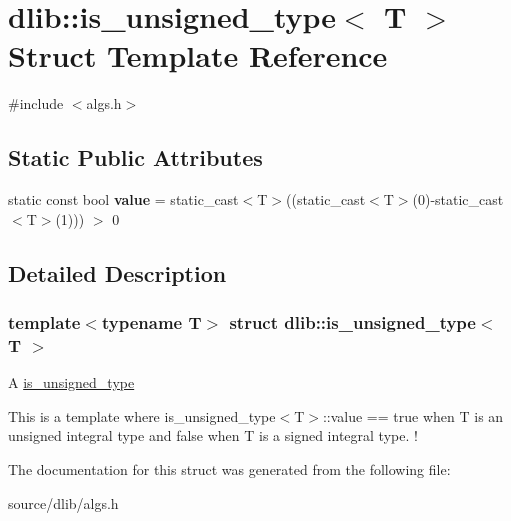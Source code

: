 \hypertarget{structdlib_1_1is__unsigned__type}{
\section{dlib::is\_\-unsigned\_\-type$<$ T $>$ Struct Template Reference}
\label{structdlib_1_1is__unsigned__type}
}


{\ttfamily \#include $<$algs.h$>$}\subsection*{Static Public Attributes}
\begin{DoxyCompactItemize}
\item 
\hypertarget{structdlib_1_1is__unsigned__type_adcd8ee9c065998d8366549eb636cf58e}{
static const bool {\bfseries value} = static\_\-cast$<$T$>$((static\_\-cast$<$T$>$(0)-\/static\_\-cast$<$T$>$(1))) $>$ 0}
\label{structdlib_1_1is__unsigned__type_adcd8ee9c065998d8366549eb636cf58e}

\end{DoxyCompactItemize}


\subsection{Detailed Description}
\subsubsection*{template$<$typename T$>$ struct dlib::is\_\-unsigned\_\-type$<$ T $>$}

A \hyperlink{structdlib_1_1is__unsigned__type}{is\_\-unsigned\_\-type}

This is a template where is\_\-unsigned\_\-type$<$T$>$::value == true when T is an unsigned integral type and false when T is a signed integral type. ! 

The documentation for this struct was generated from the following file:\begin{DoxyCompactItemize}
\item 
source/dlib/algs.h\end{DoxyCompactItemize}
